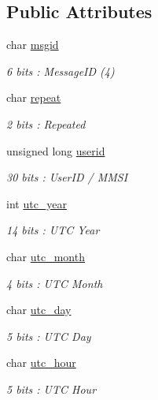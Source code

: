 \subsection*{Public Attributes}
\begin{DoxyCompactItemize}
\item 
char \mbox{\hyperlink{structaismsg__11_a378cd886896d0ae47b462ef13cb15ab9}{msgid}}
\begin{DoxyCompactList}\small\item\em 6 bits \+: Message\+ID (4) \end{DoxyCompactList}\item 
char \mbox{\hyperlink{structaismsg__11_ad1937ac97006ae54315b6ffa09100aab}{repeat}}
\begin{DoxyCompactList}\small\item\em 2 bits \+: Repeated \end{DoxyCompactList}\item 
unsigned long \mbox{\hyperlink{structaismsg__11_ac9f76c34f8ee1f87ef43c5ad1a4fc35f}{userid}}
\begin{DoxyCompactList}\small\item\em 30 bits \+: User\+ID / M\+M\+SI \end{DoxyCompactList}\item 
int \mbox{\hyperlink{structaismsg__11_a5472f5812abca6419dec0a21bb8729bf}{utc\+\_\+year}}
\begin{DoxyCompactList}\small\item\em 14 bits \+: U\+TC Year \end{DoxyCompactList}\item 
char \mbox{\hyperlink{structaismsg__11_afd9f140978135b126a665329aeabe091}{utc\+\_\+month}}
\begin{DoxyCompactList}\small\item\em 4 bits \+: U\+TC Month \end{DoxyCompactList}\item 
char \mbox{\hyperlink{structaismsg__11_ac2c95775ba57b89bf36eece8bda82af7}{utc\+\_\+day}}
\begin{DoxyCompactList}\small\item\em 5 bits \+: U\+TC Day \end{DoxyCompactList}\item 
char \mbox{\hyperlink{structaismsg__11_a87e40d0e0c9e2319f1871f894d20107a}{utc\+\_\+hour}}
\begin{DoxyCompactList}\small\item\em 5 bits \+: U\+TC Hour \end{DoxyCompactList}\item 

\end{DoxyCompactItemize}
